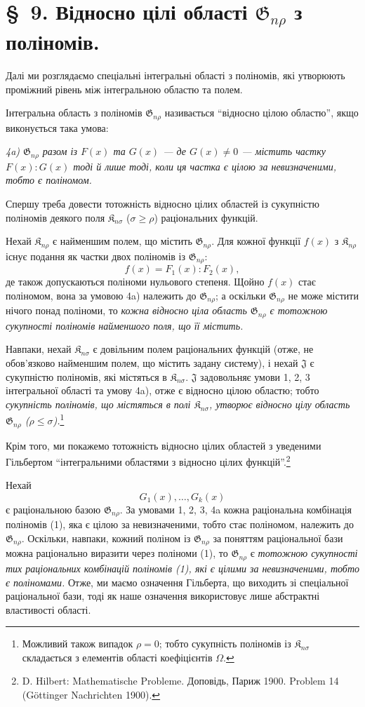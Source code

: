 \documentclass[11pt]{article}
\providecommand{\Kfield}{\mathfrak{K}}
\providecommand{\Jdom}{\mathfrak{J}}
\providecommand{\Gdom}{\mathfrak{G}}
\begin{document}
\section*{\S\ 9. Відносно цілі області $\Gdom_{n\rho}$ з поліномів.}

Далі ми розглядаємо спеціальні інтегральні області з поліномів, які утворюють проміжний рівень між інтегральною областю та полем.

Інтегральна область з поліномів $\Gdom_{n\rho}$ називається ``відносно цілою областю'', якщо виконується така умова:

\emph{4a) $\Gdom_{n\rho}$ разом із $F(x)$ та $G(x)$ --- де $G(x)\ne0$ --- містить частку $F(x):G(x)$ тоді й лише тоді, коли ця частка є цілою за невизначеними, тобто є поліномом.}

Спершу треба довести тотожність відносно цілих областей із сукупністю поліномів деякого поля $\Kfield_{n\sigma}$ ($\sigma\ge \rho$) раціональних функцій.

Нехай $\Kfield_{n\rho}$ є найменшим полем, що містить $\Gdom_{n\rho}$. Для кожної функції $f(x)$ з $\Kfield_{n\rho}$ існує подання як частки двох поліномів із $\Gdom_{n\rho}$:
\[
  f(x)=F_1(x):F_2(x),
\]
де також допускаються поліноми нульового степеня. Щойно $f(x)$ стає поліномом, вона за умовою 4a) належить до $\Gdom_{n\rho}$; а оскільки $\Gdom_{n\rho}$ не може містити нічого понад поліноми, то \emph{кожна відносно ціла область $\Gdom_{n\rho}$ є тотожною сукупності поліномів найменшого поля, що її містить.}

Навпаки, нехай $\Kfield_{n\sigma}$ є довільним полем раціональних функцій (отже, не обов'язково найменшим полем, що містить задану систему), і нехай $\Jdom$ є сукупністю поліномів, які містяться в $\Kfield_{n\sigma}$. $\Jdom$ задовольняє умови 1, 2, 3 інтегральної області та умову 4a), отже є відносно цілою областю; тобто \emph{сукупність поліномів, що містяться в полі $\Kfield_{n\sigma}$, утворює відносно цілу область $\Gdom_{n\rho}$ ($\rho\le\sigma$).}\footnote{Можливий також випадок $\rho=0$; тобто сукупність поліномів із $\Kfield_{n\sigma}$ складається з елементів області коефіцієнтів $\Omega$.}

Крім того, ми покажемо тотожність відносно цілих областей з уведеними Гільбертом ``інтегральними областями з відносно цілих функцій''.\footnote{D. Hilbert: Mathematische Probleme. Доповідь, Париж 1900. Problem 14 (Göttinger Nachrichten 1900).}

Нехай
\begin{equation}
  G_1(x),\ldots,G_k(x)
\tag{1}
\end{equation}
є раціональною базою $\Gdom_{n\rho}$. За умовами 1, 2, 3, 4a кожна раціональна комбінація поліномів (1), яка є цілою за невизначеними, тобто стає поліномом, належить до $\Gdom_{n\rho}$. Оскільки, навпаки, кожний поліном із $\Gdom_{n\rho}$ за поняттям раціональної бази можна раціонально виразити через поліноми (1), то $\Gdom_{n\rho}$ є \emph{тотожною сукупності тих раціональних комбінацій поліномів (1), які є цілими за невизначеними, тобто є поліномами.} Отже, ми маємо означення Гільберта, що виходить зі спеціальної раціональної бази, тоді як наше означення використовує лише абстрактні властивості області.
\end{document}
